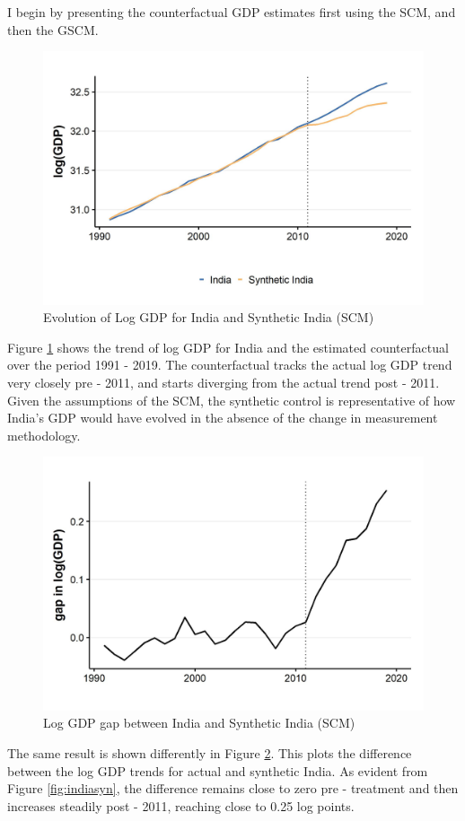 \documentclass[12pt,nobind, a4paper]{reedthesis}
\begin{document}
 I begin by presenting the counterfactual GDP estimates first using the SCM, and then the GSCM.
 \begin{figure}

 {\centering \includegraphics[width=1\linewidth]{figure/indiasynth} 

 }

 \caption{Evolution of Log GDP for India and Synthetic India (SCM)}\label{fig:indsyn}
 \end{figure}
 Figure \ref{fig:indsyn} shows the trend of log GDP for India and the estimated counterfactual over the period 1991 - 2019. The counterfactual tracks the actual log GDP trend very closely pre - 2011, and starts diverging from the actual trend post - 2011. Given the assumptions of the SCM, the synthetic control is representative of how India's GDP would have evolved in the absence of the change in measurement methodology.
 \begin{figure}

 {\centering \includegraphics[width=1\linewidth]{figure/indiasynthgap} 

 }

 \caption{Log GDP gap between India and Synthetic India (SCM)}\label{fig:indsyngap}
 \end{figure}
 The same result is shown differently in Figure \ref{fig:indsyngap}. This plots the difference between the log GDP trends for actual and synthetic India. As evident from Figure \ref{fig:indiasyn}, the difference remains close to zero pre - treatment and then increases steadily post - 2011, reaching close to 0.25 log points.
 \linebreak
\end{document}
